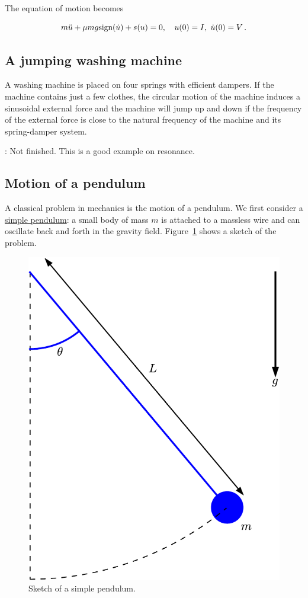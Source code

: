 \documentclass[%
oneside,                 %
final,                   %
10pt]{article}
\newcommand{\shortinlinecomment}[3]{{\color{red}{\bf #1}: #2}}
\begin{document}
The equation of motion becomes

\begin{equation}
m\ddot u + \mu mg\hbox{sign}(\dot u) + s(u) = 0,\quad u(0)=I,\ \dot u(0)=V\tp
\label{vib:app:mass_sliding:equ}
\end{equation}

\subsection{A jumping washing machine}
\label{vib:app:washmach}

A washing machine is placed on four springs with efficient dampers.
If the machine contains just a few clothes, the circular motion of
the machine induces a sinusoidal external force and the machine will
jump up and down if the frequency of the external force is close to
the natural frequency of the machine and its spring-damper system.

\shortinlinecomment{hpl 10}{ Not finished. This is a good example on resonance. }{ Not finished. This is }



\subsection{Motion of a pendulum}
\label{vib:app:pendulum}

A classical problem in mechanics is the motion of a pendulum. We first
consider a \href{{https://en.wikipedia.org/wiki/Pendulum}}{simple pendulum}:
a small body of mass $m$ is attached to a massless wire and can oscillate back and forth
in the gravity field. Figure~\ref{vib:app:pendulum:fig_problem} shows
a sketch of the problem.


\begin{figure}[!ht]  %
  \centerline{\includegraphics[width=0.4\linewidth]{fig-vib/pendulum_problem.pdf}}
  \caption{
  Sketch of a simple pendulum. \label{vib:app:pendulum:fig_problem}
  }
\end{figure}
\end{document}
